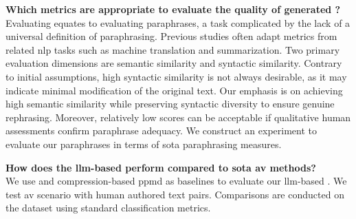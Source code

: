 \begin{questions}
    \item \textbf{Which metrics are appropriate to evaluate the quality of generated \imps{}?} \label{enum:rq2} \hfill \\
    Evaluating \imps{} equates to evaluating paraphrases, a task complicated by the lack of a universal definition of paraphrasing.
    Previous studies often adapt metrics from related \ac{nlp} tasks such as machine translation and summarization.
    Two primary evaluation dimensions are semantic similarity and syntactic similarity.
    Contrary to initial assumptions, high syntactic similarity is not always desirable, as it may indicate minimal modification of the original text.
    Our emphasis is on achieving high semantic similarity while preserving syntactic diversity to ensure genuine rephrasing.
    Moreover, relatively low scores can be acceptable if qualitative human assessments confirm paraphrase adequacy.
    We construct an experiment to evaluate our paraphrases in terms of \acl{sota} paraphrasing measures. 


    \item \textbf{How does the \ac{llm}-based \impAppr{} perform compared to \acl{sota} \ac{av} methods?} \label{enum:rq3} \hfill \\
    We use \unmasking{} and compression-based \ac{ppmd} as baselines to evaluate our \ac{llm}-based \impAppr{}.
    We test \ac{av} scenario with human authored text pairs. %
    Comparisons are conducted on the \dataStudent{} dataset using standard classification metrics.
    
\end{questions}





